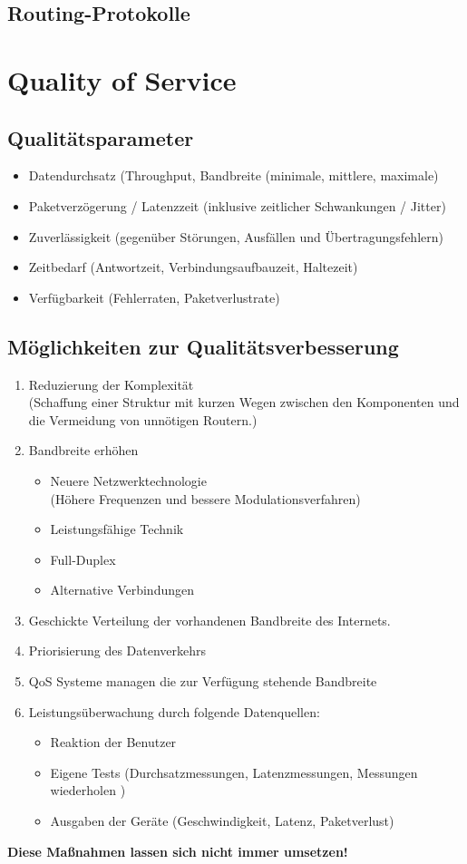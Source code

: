 \documentclass{article} %
\begin{document}
\subsection{Routing-Protokolle}
\section{Quality of Service}
\label{sec:qos}
\subsection{Qualitätsparameter}
	\begin{itemize}
	\item Datendurchsatz (Throughput, Bandbreite (minimale, mittlere, maximale)
	\item Paketverzögerung / Latenzzeit (inklusive zeitlicher Schwankungen / Jitter)
	\item Zuverlässigkeit (gegenüber Störungen,  Ausfällen und Übertragungsfehlern)
	\item Zeitbedarf (Antwortzeit,  Verbindungsaufbauzeit,  Haltezeit)
	\item Verfügbarkeit (Fehlerraten,  Paketverlustrate)
	\end{itemize}
	
\subsection{Möglichkeiten zur Qualitätsverbesserung}
	\begin{enumerate}
	\item Reduzierung der Komplexität\\
	(Schaffung einer Struktur mit kurzen Wegen zwischen den Komponenten und die Vermeidung von unnötigen Routern.)
	\item Bandbreite erhöhen
		\begin{itemize}
		\item Neuere Netzwerktechnologie\\
		(Höhere Frequenzen und bessere Modulationsverfahren)
		\item Leistungsfähige Technik
		\item Full-Duplex
		\item Alternative Verbindungen
		\end{itemize}
	\item Geschickte Verteilung der vorhandenen Bandbreite des Internets.
	\item Priorisierung des Datenverkehrs
	\item QoS Systeme managen die zur Verfügung stehende Bandbreite
	\item Leistungsüberwachung durch folgende Datenquellen:
		\begin{itemize}
		\item Reaktion der Benutzer
		\item Eigene Tests (Durchsatzmessungen, Latenzmessungen, Messungen wiederholen )
		\item Ausgaben der Geräte (Geschwindigkeit, Latenz, Paketverlust)
		\end{itemize}
	\end{enumerate}
\textbf{Diese Maßnahmen lassen sich nicht immer umsetzen!}
\end{document}
